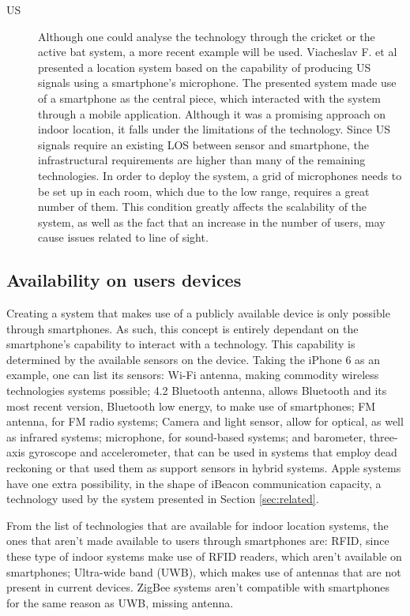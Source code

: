 \begin{description}
 
 
 
\item[\ac{US}] Although one could analyse the technology through the cricket or the active bat system, a more recent example will be used. 
Viacheslav F. et al \cite{us_ex} presented a location system based on the capability of producing \ac{US} signals using a smartphone's microphone. The presented system made use of a smartphone as the central piece, which interacted with the system through a mobile application. Although it was a promising approach on indoor location, it falls under the limitations of the technology. Since \ac{US} signals require an existing \ac{LOS} between sensor and smartphone, the infrastructural requirements are higher than many of the remaining technologies. In order to deploy the system, a grid of microphones needs to be set up in each room, which due to the low range, requires a great number of them. This condition greatly affects the scalability of the system, as well as the fact that an increase in the number of users, may cause issues related to line of sight. 
\end{description} 
 
 
 
 
\subsection{Availability on users devices} 
\label{subsec:availability} 
 
 
Creating a system that makes use of a publicly available device is only possible through smartphones. As such, this concept is entirely dependant on the smartphone's capability to interact with a technology. This capability is determined by the available sensors on the device. 
Taking the iPhone 6 as an example, one can list its sensors\cite{iphone}: Wi-Fi antenna, making commodity wireless technologies systems possible; 4.2 Bluetooth antenna, allows Bluetooth and its most recent version, Bluetooth low energy, to make use of smartphones; FM antenna, for FM radio systems; Camera and light sensor, allow for optical, as well as infrared systems; microphone, for sound-based systems; and barometer, three-axis gyroscope and accelerometer, that can be used in systems that employ dead reckoning or that used them as support sensors in hybrid systems. Apple systems have one extra possibility, in the shape of iBeacon communication capacity, a technology used by the system presented in Section \ref{sec:related}. 
 
 
From the list of technologies that are available for indoor location systems, the ones that aren't made available to users through smartphones are: RFID, since these type of indoor systems make use of \ac{RFID} readers, which aren't available on smartphones; Ultra-wide band (UWB), which makes use of antennas that are not present in current devices. ZigBee systems aren't compatible with smartphones for the same reason as UWB, missing antenna. 
 
